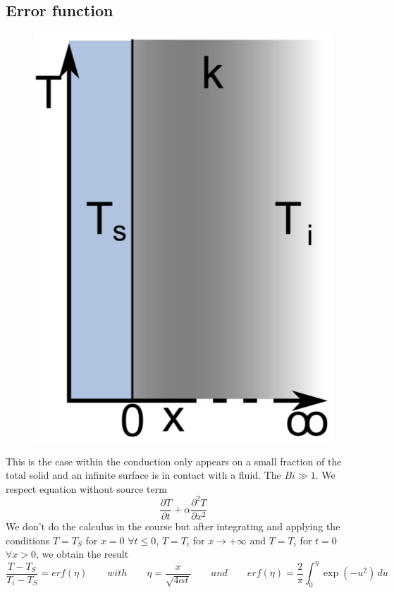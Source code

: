 	\subsection{Error function}
		\begin{figure}
		\vspace{-5mm}
		\includegraphics[scale=0.2]{ch4/2}
		\end{figure}	
		This is the case within the conduction only appears on a small fraction of the total solid and an infinite surface is in contact with a fluid. The $Bi \gg 1$. We respect equation without source term 
		\begin{equation}
			\frac{\partial T}{\partial t} + \alpha \frac{\partial ^2 T}{\partial x^2 }
		\end{equation}
		We don't do the calculus in the course but after integrating and applying the conditions $T = T_S$ for $x=0$ $\forall t \leq 0$, $T = T_i$ for $x\rightarrow + \infty$ and $T = T_i$ for $t=0$ $\forall x > 0$, we obtain the result 
		\begin{equation}
			\frac{T-T_S}{T_i-T_S} = erf(\eta ) \qquad with \qquad \eta = \frac{x}{\sqrt{4\alpha t}} \qquad and \qquad erf(\eta ) = \frac{2}{\pi} \int _0 ^\eta \exp (-u^2) \, du
		\end{equation}
		
